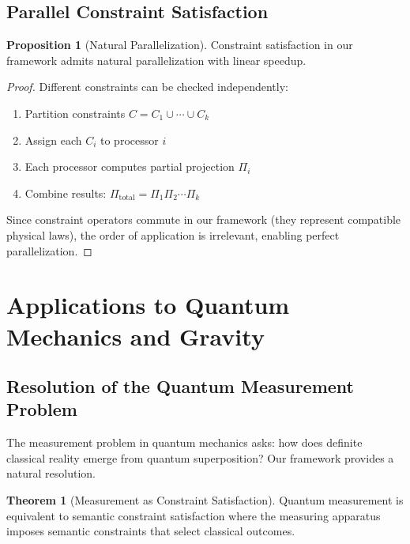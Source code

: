 \documentclass[11pt]{article}
\theoremstyle{definition}
\newtheorem{theorem}{Theorem}[section]
\newtheorem{proposition}{Proposition}[section]
\begin{document}
\subsection{Parallel Constraint Satisfaction}

\begin{proposition}[Natural Parallelization]
Constraint satisfaction in our framework admits natural parallelization with linear speedup.
\end{proposition}

\begin{proof}
Different constraints can be checked independently:
\begin{enumerate}
\item Partition constraints $C = C_1 \cup \cdots \cup C_k$
\item Assign each $C_i$ to processor $i$
\item Each processor computes partial projection $\Pi_i$
\item Combine results: $\Pi_{\text{total}} = \Pi_1 \Pi_2 \cdots \Pi_k$
\end{enumerate}

Since constraint operators commute in our framework (they represent compatible physical laws), the order of application is irrelevant, enabling perfect parallelization.
\end{proof}

\section{Applications to Quantum Mechanics and Gravity}

\subsection{Resolution of the Quantum Measurement Problem}

The measurement problem in quantum mechanics asks: how does definite classical reality emerge from quantum superposition? Our framework provides a natural resolution.

\begin{theorem}[Measurement as Constraint Satisfaction]
Quantum measurement is equivalent to semantic constraint satisfaction where the measuring apparatus imposes semantic constraints that select classical outcomes.
\end{theorem}
\end{document}
